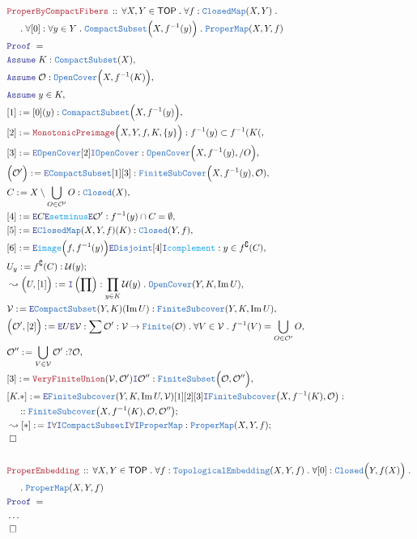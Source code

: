 \documentclass[12pt]{scrartcl}
\newcommand{\TYPE}[1]{\textcolor{NavyBlue}{\mathtt{#1}}}
\newcommand{\FUNC}[1]{\textcolor{Cerulean}{\mathtt{#1}}}
\newcommand{\LOGIC}[1]{\textcolor{Blue}{\mathtt{#1}}}
\newcommand{\THM}[1]{\textcolor{Maroon}{\mathtt{#1}}}
\renewcommand{\.}{\; . \;}
\newcommand{\de}{: \kern 0.1pc =}
\newcommand{\Act}[1]{\left( #1 \right)}
\newcommand{\Theorem}[2]{& \THM{#1} \, :: \, #2 \\ & \Proof = \\ }
\newcommand{\NewLine}{\\ & \kern 1pc}
\newcommand{\Page}[1]{ \begin{align*} #1 \end{align*}   }
\newcommand{\NoProof}{ & \ldots \\ \EndProof}
\newcommand{\Intro}{\LOGIC{I}}
\newcommand{\Elim}{\LOGIC{E}}
\DeclareMathOperator*{\im}{Im}
\renewcommand{\c}{\complement}
\newcommand{\Say}[3]{& #1 \de #2 : #3, \\}
\newcommand{\Conclude}[3]{& #1 \de #2 : #3; \\}
\newcommand{\Derive}[3]{& \leadsto #1 \de #2 : #3, \\}
\newcommand{\DeriveConclude}[3]{& \leadsto #1 \de #2 : #3 ; \\}
\newcommand{\Assume}[2]{& \LOGIC{Assume} \; #1 : #2, \\}
\newcommand{\AssumeIn}[2]{& \LOGIC{Assume} \; #1 \in #2, \\}
\newcommand{\QED}{\; \square}
\newcommand{\EndProof}{& \QED \\}
\newcommand{\Proof}{\LOGIC{Proof} \; }
\newcommand{\TOP}{\mathsf{TOP}}
\newcommand{\U}{\mathcal{U}}
\renewcommand{\O}{\mathcal{O}}
\renewcommand{\O}{\mathcal{O}}
\begin{document}
\Page{
	\Theorem{ProperByCompactFibers}
	{
		\forall X,Y \in \TOP \.
		\forall f : \TYPE{ClosedMap}(X,Y) \. \NewLine \. 
		\forall [0] : \forall y \in Y \. 
		\TYPE{CompactSubset}\Big(X,f^{-1}(y)\Big) \. 
		\TYPE{ProperMap}(X,Y,f)
	}
	\Assume{K}{\TYPE{CompactSubset}(X)}
	\Assume{\O}{\TYPE{OpenCover}\Big(X,f^{-1}(K)\Big)}
	\AssumeIn{y}{K}
	\Say{[1]}{[0](y)}{\TYPE{ComapactSubset}\Big(X,f^{-1}(y)\Big)}
	\Say{[2]}{\THM{MonotonicPreimage}\Big(X,Y,f,K,\{y\}\Big)}
	{
		f^{-1}(y) \subset f^{-1}(K(
	}
	\Say{[3]}{\Elim \TYPE{OpenCover}[2]\Intro \TYPE{OpenCover}}
	{
		\TYPE{OpenCover}\Big( X, f^{-1}(y),/O \Big)
	}
	\Say{\Big(\O' \Big)}{\Elim \TYPE{CompactSubset}[1][3]}
	{
		\TYPE{FiniteSubCover}\Big(X,f^{-1}(y),\O)
	}
	\Say{C}{X \setminus \bigcup_{O \in \O'} O}
	{
		\TYPE{Closed}(X)	
	}
	\Say{[4]}{\Elim C \Elim \FUNC{setminus}\Elim \O' }
	{
		f^{-1}(y) \cap C = \emptyset
	}
	\Say{[5]}{\Elim \TYPE{ClosedMap}(X,Y,f)(K)}{\TYPE{Closed}(Y,f)}
	\Say{[6]}{
		\Elim \FUNC{image}\Big(f,f^{-1}(y)\Big) 
		\Elim \TYPE{Disjoint} [4] 
		\Intro \FUNC{complement}
	}
	{
		y \in f^\c(C)
	}
	\Conclude{U_y}{f^\c(C)}{\U(y)}
	\Derive{\Big( U, [1] \Big)}{\Intro\Act{\prod}}
	{
		\prod_{y \in K} \U(y) \. \TYPE{OpenCover}(Y,K,\im U) 
	}
	\Say{\mathcal{V}}{\Elim \TYPE{CompactSubset}(Y,K)(\im U)}
	{
		\TYPE{FiniteSubcover}(Y,K,\im U) 
	}
	\Say{\Big(\O', [2] \Big)}{\Elim U \Elim \mathcal{V}}
	{
		\sum \O' : \mathcal{V} \to \TYPE{Finite}(\O) \. 
		\forall V \in \mathcal{V} \. f^{-1}(V) = \bigcup_{O \in \O'} O
	}
	\Say{\O''}{\bigcup_{V \in \mathcal{V}} \O'}{?\O}
	\Say{[3]}{\THM{VeryFiniteUnion}(\mathcal{V},\O')\Intro \O''}
	{
		\TYPE{FiniteSubset}\Big(\O,\O''\Big)
	}
	\Conclude{[K.*]}{
		\Elim \TYPE{FiniteSubcover}(Y,K,\im U,\mathcal{V})
		[1][2][3]
		\Intro \TYPE{FiniteSubcover}\big(X,f^{-1}(K),\O\big)
	}
	{
		\NewLine ::
		\TYPE{FiniteSubcover}\big( X, f^{-1}(K),\O,\O'' \big)
	}
	\DeriveConclude{[*]}{
		\Intro \forall
		\Intro \TYPE{CompactSubset}
		\Intro \forall 
		\Intro \TYPE{ProperMap}
	}
	{
		\TYPE{ProperMap}(X,Y,f)
	}
	\EndProof
	\\
	\Theorem{ProperEmbedding}
	{
		\forall X,Y \in \TOP \.
		\forall f : \TYPE{TopologicalEmbedding}(X,Y,f) \.
		\forall [0] : \TYPE{Closed}\Big(Y,f(X)\Big) \.
		\NewLine \. 
		\TYPE{ProperMap}(X,Y,f)
	}
	\NoProof
}
\end{document}
